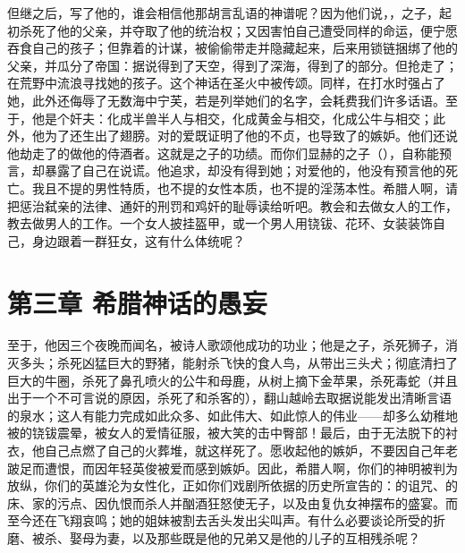 但继之后，写了他的，谁会相信他那胡言乱语的神谱呢？因为他们说，，之子，起初杀死了他的父亲，并夺取了他的统治权；又因害怕自己遭受同样的命运，便宁愿吞食自己的孩子；但靠着的计谋，被偷偷带走并隐藏起来，后来用锁链捆绑了他的父亲，并瓜分了帝国：据说得到了天空，得到了深海，得到了的部分。但抢走了；在荒野中流浪寻找她的孩子。这个神话在圣火中被传颂。同样，在打水时强占了她，此外还侮辱了无数海中宁芙，若是列举她们的名字，会耗费我们许多话语。至于，他是个奸夫：化成半兽半人与相交，化成黄金与相交，化成公牛与相交；此外，他为了还生出了翅膀。对的爱既证明了他的不贞，也导致了的嫉妒。他们还说他劫走了的做他的侍酒者。这就是之子的功绩。而你们显赫的之子（），自称能预言，却暴露了自己在说谎。他追求，却没有得到她；对爱他的，他没有预言他的死亡。我且不提的男性特质，也不提的女性本质，也不提的淫荡本性。希腊人啊，请把惩治弑亲的法律、通奸的刑罚和鸡奸的耻辱读给听吧。教会和去做女人的工作，教去做男人的工作。一个女人披挂盔甲，或一个男人用铙钹、花环、女装装饰自己，身边跟着一群狂女，这有什么体统呢？\par


\section{第三章 希腊神话的愚妄}

至于，他因三个夜晚而闻名，被诗人歌颂他成功的功业；他是之子，杀死狮子，消灭多头；杀死凶猛巨大的野猪，能射杀飞快的食人鸟，从带出三头犬；彻底清扫了巨大的牛圈，杀死了鼻孔喷火的公牛和母鹿，从树上摘下金苹果，杀死毒蛇（并且出于一个不可言说的原因，杀死了和杀客的），翻山越岭去取据说能发出清晰言语的泉水；这人有能力完成如此众多、如此伟大、如此惊人的伟业——却多么幼稚地被的铙钹震晕，被女人的爱情征服，被大笑的击中臀部！最后，由于无法脱下的衬衣，他自己点燃了自己的火葬堆，就这样死了。愿收起他的嫉妒，不要因自己年老跛足而遭恨，而因年轻英俊被爱而感到嫉妒。因此，希腊人啊，你们的神明被判为放纵，你们的英雄沦为女性化，正如你们戏剧所依据的历史所宣告的：的诅咒、的床、家的污点、因仇恨而杀人并酗酒狂怒使无子，以及由复仇女神摆布的盛宴。而至今还在飞翔哀鸣；她的姐妹被割去舌头发出尖叫声。有什么必要谈论所受的折磨、被杀、娶母为妻，以及那些既是他的兄弟又是他的儿子的互相残杀呢？\par

